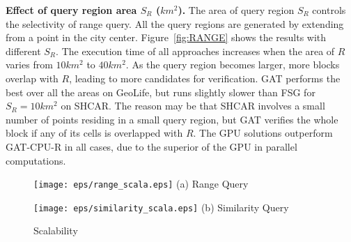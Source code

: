 \documentclass[10pt,conference,letterpaper]{IEEEtran}
\newcommand{\frname}{GAT\xspace }
\begin{document}



\vspace{0.1cm}\textbf{Effect of query region area $S_R$ ($km^2$).}
The area of query region $S_{R}$ controls the selectivity of range query. All the query regions are generated by extending from a point in the city center. Figure~\ref{fig:RANGE} shows the results with different $S_{R}$.
The execution time of all approaches increases when the area of $R$ varies from $10km^2$ to $40km^2$.
As the query region becomes larger, more blocks overlap with $R$, leading to more candidates for verification.
\frname performs the best over all the areas on GeoLife, but runs slightly slower than FSG for $S_R=10km^2$ on SHCAR. The reason may be that SHCAR involves a small number of points residing in a small query region, but \frname verifies the whole block if any of its cells is overlapped with $R$.  
The GPU solutions outperform \frname-CPU-R in all cases, due to the superior of the GPU in parallel computations.


\begin{figure}[t]\centering
	\scriptsize{
		\begin{minipage}{0.48\linewidth}
			\centering
			\texttt{[image: eps/range\_scala.eps]}
			(a) Range Query
		\end{minipage}
		\hfill
		\begin{minipage}{0.48\linewidth}
			\centering
			\texttt{[image: eps/similarity\_scala.eps]}
			(b) Similarity Query
		\end{minipage}
	}
	\caption{Scalability\label{fig:Scalability}}
	\vspace{-.1in}
\end{figure}
\end{document}
